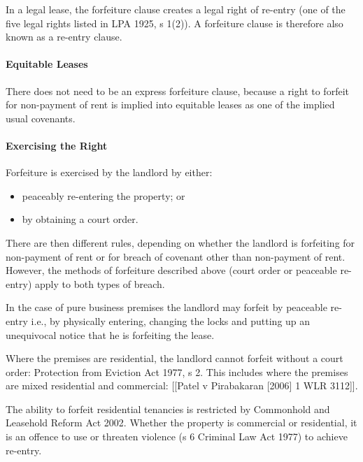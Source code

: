 \documentclass[
]{article}
\newenvironment{Shaded}{}{}
\newcommand{\NormalTok}[1]{#1}
\providecommand{\tightlist}{%
  \setlength{\itemsep}{0pt}\setlength{\parskip}{0pt}}
\begin{document}
\begin{Shaded}
\begin{Highlighting}[]
\NormalTok{In a legal lease, the forfeiture clause creates a legal right of re{-}entry (one of the five legal rights listed in LPA 1925, s 1(2)). A forfeiture clause is therefore also known as a re{-}entry clause.}
\end{Highlighting}
\end{Shaded}

\hypertarget{equitable-leases-1}{%
\paragraph{Equitable Leases}\label{equitable-leases-1}}

There does not need to be an express forfeiture clause, because a right
to forfeit for non-payment of rent is implied into equitable leases as
one of the implied usual covenants.

\hypertarget{exercising-the-right}{%
\paragraph{Exercising the Right}\label{exercising-the-right}}

Forfeiture is exercised by the landlord by either:

\begin{itemize}
\tightlist
\item
  peaceably re-entering the property; or
\item
  by obtaining a court order.
\end{itemize}

There are then different rules, depending on whether the landlord is
forfeiting for non-payment of rent or for breach of covenant other than
non-payment of rent. However, the methods of forfeiture described above
(court order or peaceable re-entry) apply to both types of breach.

In the case of pure business premises the landlord may forfeit by
peaceable re-entry i.e., by physically entering, changing the locks and
putting up an unequivocal notice that he is forfeiting the lease.

Where the premises are residential, the landlord cannot forfeit without
a court order: Protection from Eviction Act 1977, s 2. This includes
where the premises are mixed residential and commercial: {[}{[}Patel v
Pirabakaran {[}2006{]} 1 WLR 3112{]}{]}.

The ability to forfeit residential tenancies is restricted by Commonhold
and Leasehold Reform Act 2002. Whether the property is commercial or
residential, it is an offence to use or threaten violence (s 6 Criminal
Law Act 1977) to achieve re-entry.
\end{document}
